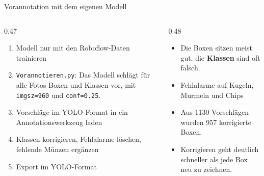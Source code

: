 \begin{frame}{Vorannotation mit dem eigenen Modell}
\footnotesize
\begin{columns}
\begin{column}{0.47\textwidth}
\begin{enumerate}
  \item Modell nur mit den Roboflow-Daten trainieren
  \item \texttt{Vorannotieren.py}: Das Modell schlägt für alle Fotos Boxen und Klassen vor, mit \texttt{imgsz=960} und \texttt{conf=0.25}.
  \item Vorschläge im YOLO-Format in ein Annotationswerkzeug laden
  \item Klassen korrigieren, Fehlalarme löschen, fehlende Münzen ergänzen
  \item Export im YOLO-Format
\end{enumerate}
\end{column}
\begin{column}{0.48\textwidth}
\begin{itemize}
  \item Die Boxen sitzen meist gut, die \textbf{Klassen} sind oft falsch.
  \item Fehlalarme auf Kugeln, Murmeln und Chips
  \item Aus 1130 Vorschlägen wurden 957 korrigierte Boxen.
  \item Korrigieren geht deutlich schneller als jede Box neu zu zeichnen.
\end{itemize}
\vspace{0.5em}
\centering
{}
\end{column}
\end{columns}
\end{frame}

